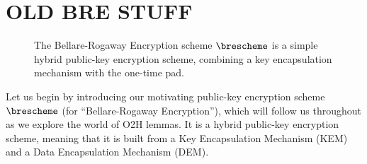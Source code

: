 \section{OLD BRE STUFF}
  \begin{figure}[t]
    \centering
    \begin{pchstack}[center]
      \procedure{$\brepm(\secparam)$}{
        \params \sample \kempm(\secparam) \\
        \pcreturn \params
      }

      \pchspace

      \procedure{$\brekg(\params)$}{
        (\pk, \sk) \sample \kemkg(\params) \\
        \pcreturn (\pk, \sk)
      }

      \pchspace

      \procedure{$\breenc_\pk(\mssg)$}{
        (\demkey, \kemctxt) \sample \kemenc_\pk \\
        \rnd \gets \RO_{\abs{\mssg}}(\pk, \demkey, \kemctxt) \\
        \demctxt \gets \mssg \xor \rnd \\
        \pcreturn (\kemctxt, \demctxt)
      }

      \pchspace

      \procedure{$\bredec_\sk(\kemctxt, \demctxt)$}{
        \demkey \gets \kemdec_\sk(\kemctxt) \\
        \rnd \gets \RO_{\abs{\demctxt}}(\pk, \demkey, \kemctxt) \\
        \mssg \gets \demctxt \xor \rnd \\
        \pcreturn \mssg
      }
    \end{pchstack}
  \caption{
    \label{fig:bre}
    The Bellare-Rogaway Encryption scheme $\brescheme$ is a simple hybrid
    public-key encryption scheme, combining a key encapsulation mechanism with
    the one-time pad.
  }
  \end{figure}


  Let us begin by introducing our motivating public-key encryption scheme
    $\brescheme$ (for ``Bellare-Rogaway Encryption''), which will follow us
    throughout as we explore the world of O2H lemmas. It is a hybrid public-key
    encryption scheme, meaning that it is built from a Key Encapsulation Mechanism (KEM) and a
    Data Encapsulation Mechanism (DEM). 

